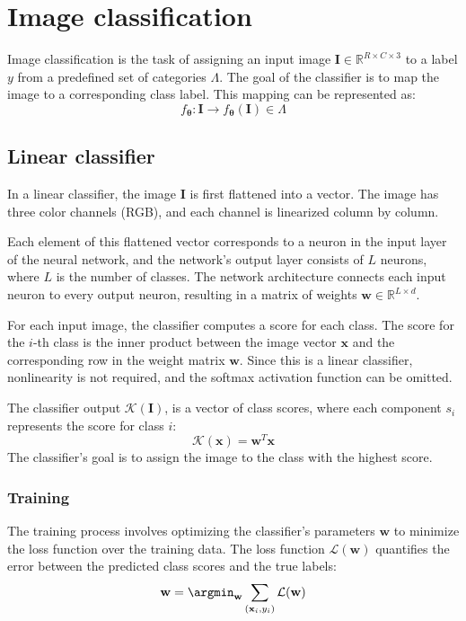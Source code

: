 \section{Image classification}

Image classification is the task of assigning an input image $\mathbf{I}\in\mathbb{R}^{R\times C \times 3}$ to a label $y$ from a predefined set of categories $\Lambda$. 
The goal of the classifier is to map the image to a corresponding class label. 
This mapping can be represented as:
\[f_{\boldsymbol{\theta}}:\mathbf{I} \rightarrow f_{\boldsymbol{\theta}}(\mathbf{I})\in\Lambda\]

\subsection{Linear classifier}
In a linear classifier, the image $\mathbf{I}$ is first flattened into a vector.
The image has three color channels (RGB), and each channel is linearized column by column.

Each element of this flattened vector corresponds to a neuron in the input layer of the neural network, and the network's output layer consists of $L$ neurons, where $L$ is the number of classes.
The network architecture connects each input neuron to every output neuron, resulting in a matrix of weights $\mathbf{w}\in\mathbb{R}^{L\times d}$. 

For each input image, the classifier computes a score for each class.
The score for the $i$-th class is the inner product between the image vector $\mathbf{x}$ and the corresponding row in the weight matrix $\mathbf{w}$. 
Since this is a linear classifier, nonlinearity is not required, and the softmax activation function can be omitted.

The classifier output $\mathcal{K}(\mathbf{I})$, is a vector of class scores, where each component $s_i$ represents the score for class $i$:
\[\mathcal{K}(\mathbf{x})=\mathbf{w}^T\mathbf{x}\]
The classifier's goal is to assign the image to the class with the highest score.

\subsubsection{Training}
The training process involves optimizing the classifier's parameters $\mathbf{w}$ to minimize the loss function over the training data.
The loss function $\mathcal{L}(\mathbf{w})$ quantifies the error between the predicted class scores and the true labels:
\[\mathbf{w}=\argmin_{\mathbf{w}}\sum_{(\mathbf{x}_i,y_i)}\mathcal{L}(\mathbf{w})\]


